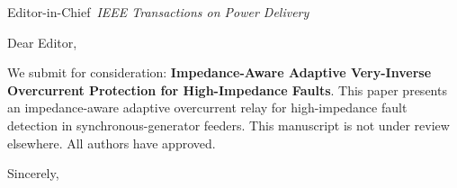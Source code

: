 \documentclass[11pt,a4paper]{letter}
\begin{document}
\begin{letter}{Editor-in-Chief\ \textit{IEEE Transactions on Power Delivery}}
\opening{Dear Editor,}
We submit for consideration: \textbf{Impedance-Aware Adaptive Very-Inverse Overcurrent Protection for High-Impedance Faults}.
This paper presents an impedance-aware adaptive overcurrent relay for high-impedance fault detection in synchronous-generator feeders.
This manuscript is not under review elsewhere. All authors have approved.
\closing{Sincerely,}
\end{letter}
\end{document}
